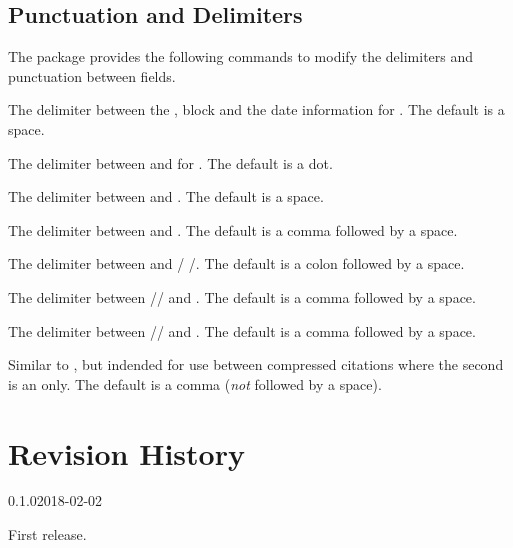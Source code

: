 \documentclass{ltxdockit}
\begin{document}
\subsection{Punctuation and Delimiters}
The package provides the following commands to modify the delimiters and
punctuation between fields.
\begin{ltxsyntax}
The delimiter between the ,  block and the
date information for .
The default is a space.

The delimiter between  and  for
.
The default is a dot.

The delimiter between  and .
The default is a space.

The delimiter between  and .
The default is a comma followed by a space.

The delimiter between  and /%
/.
The default is a colon followed by a space.

The delimiter between //%
 and .
The default is a comma followed by a space.

The delimiter between //%
 and .
The default is a comma followed by a space.

Similar to , but indended for use between compressed
citations where the second is an  only.
The default is a comma (\emph{not} followed by a space).
\end{ltxsyntax}



\section{Revision History}\label{apx:log}
\begin{changelog}
\begin{release}{0.1.0}{2018-02-02}
\item First release.
\end{release}
\end{changelog}
\end{document}
